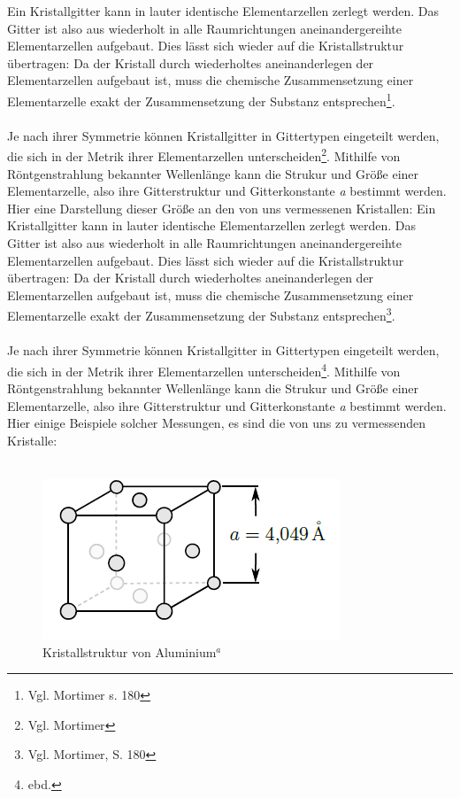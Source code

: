 \documentclass[12pt,a4paper,titlepage,headinclude,bibtotoc]{scrartcl}
\begin{document}
Ein Kristallgitter kann in lauter identische Elementarzellen zerlegt werden. Das Gitter ist also aus wiederholt in alle Raumrichtungen aneinandergereihte Elementarzellen aufgebaut. Dies lässt sich wieder auf die Kristallstruktur übertragen: Da der Kristall durch wiederholtes aneinanderlegen der Elementarzellen aufgebaut ist, muss die chemische Zusammensetzung einer Elementarzelle exakt der Zusammensetzung der Substanz entsprechen\footnote{Vgl. Mortimer s. 180}.\\\\
Je nach ihrer Symmetrie können Kristallgitter in Gittertypen eingeteilt werden, die sich in der Metrik ihrer Elementarzellen unterscheiden\footnote{Vgl. Mortimer}. Mithilfe von Röntgenstrahlung bekannter Wellenlänge kann die Strukur und Größe einer Elementarzelle, also ihre Gitterstruktur und Gitterkonstante \textit{a} bestimmt werden. Hier eine Darstellung dieser Größe an den von uns vermessenen Kristallen:
Ein Kristallgitter kann in lauter identische Elementarzellen zerlegt werden. Das Gitter ist also aus wiederholt in alle Raumrichtungen aneinandergereihte Elementarzellen aufgebaut. Dies lässt sich wieder auf die Kristallstruktur übertragen: Da der Kristall durch wiederholtes aneinanderlegen der Elementarzellen aufgebaut ist, muss die chemische Zusammensetzung einer Elementarzelle exakt der Zusammensetzung der Substanz entsprechen\footnote{Vgl. Mortimer, S. 180}.\\\\
Je nach ihrer Symmetrie können Kristallgitter in Gittertypen eingeteilt werden, die sich in der Metrik ihrer Elementarzellen unterscheiden\footnote{ebd.}. Mithilfe von Röntgenstrahlung bekannter Wellenlänge kann die Strukur und Größe einer Elementarzelle, also ihre Gitterstruktur und Gitterkonstante \textit{a} bestimmt werden. Hier einige Beispiele solcher Messungen, es sind die von uns zu vermessenden Kristalle:\\\\



\begin{figure} [h]
\begin{center}
\includegraphics[scale=0.7]{Aluminium.png} \end{center}
\caption{Kristallstruktur von Aluminium$^a$}
\end{figure}
\end{document}
